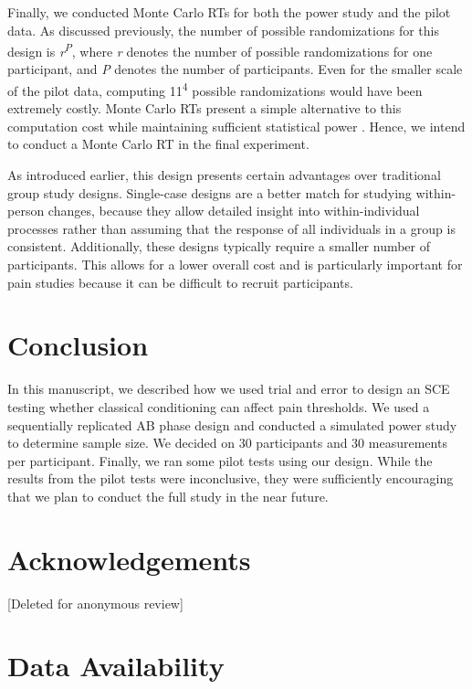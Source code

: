 \documentclass{article}
\begin{document}
Finally, we conducted Monte Carlo RTs for both the power study and the pilot data. As discussed previously, the number of possible randomizations for this design is \emph{r}\textsuperscript{\emph{P}}, where \emph{r} denotes the number of possible randomizations for one participant, and \emph{P} denotes the number of participants. Even for the smaller scale of the pilot data, computing 11\textsuperscript{4} possible randomizations would have been extremely costly. Monte Carlo RTs present a simple alternative to this computation cost while maintaining sufficient statistical power \parencite{Edgington1969}\parencite{Hope1968}. Hence, we intend to conduct a Monte Carlo RT in the final experiment.

As introduced earlier, this design presents certain advantages over traditional group study designs. Single-case designs are a better match for studying within-person changes, because they allow detailed insight into within-individual processes rather than assuming that the response of all individuals in a group is consistent. Additionally, these designs typically require a smaller number of participants. This allows for a lower overall cost and is particularly important for pain studies because it can be difficult to recruit participants.

\section{Conclusion}

In this manuscript, we described how we used trial and error to design an SCE testing whether classical conditioning can affect pain thresholds. We used a sequentially replicated AB phase design and conducted a simulated power study to determine sample size. We decided on 30 participants and 30 measurements per participant. Finally, we ran some pilot tests using our design. While the results from the pilot tests were inconclusive, they were sufficiently encouraging that we plan to conduct the full study in the near future.

\section{Acknowledgements}

[Deleted for anonymous review]

\section{Data Availability}
\end{document}
